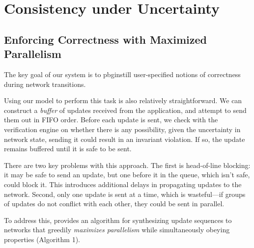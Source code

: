
\section{Consistency under Uncertainty}


\subsection{Enforcing Correctness with  Maximized Parallelism}
\label{sec:parallelism}

The key goal of our system is to pbg{instill}
user-specified notions of correctness during network transitions.

Using our model to perform this task is also relatively straightforward.
We can construct a {\em buffer} of updates received from the application,
and attempt to send them out in FIFO order. Before each update is sent, we check with the
verification engine on whether there is any possibility, given the uncertainty in network state, sending it could result in an invariant violation. If so, the update remains buffered until it is safe to be sent.

There are two key problems with this approach.
The first is head-of-line blocking: it may be safe to send an update, but one before it in the queue, which isn't safe, could block it. This introduces additional delays in propagating updates
to the network.
Second, only one update is sent at a time, which is wasteful---if groups of updates do not conflict with each other, they could be sent in parallel.

To address this,
\name provides an algorithm for synthesizing update sequences to networks that greedily {\em maximizes parallelism} while
simultaneously obeying  properties
(Algorithm 1).%

